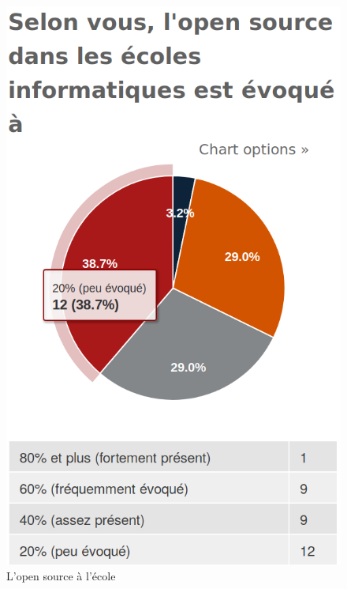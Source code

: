 			\begin{figure}[h]
				\center
				\includegraphics[scale=0.28]{./img/a5}
				\caption{L'open source à l'école}					
			\end{figure}









